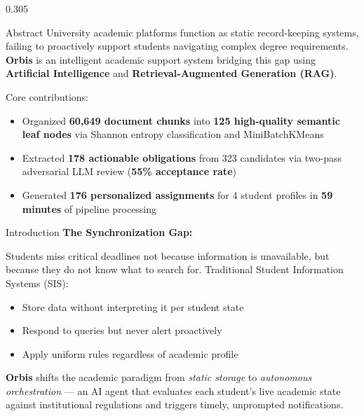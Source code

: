 \documentclass[final]{beamer}
\newcommand{\compactitem}{%
  \setlength{\itemsep}{4pt}%
  \setlength{\parskip}{0pt}%
  \setlength{\parsep}{0pt}%
  \setlength{\topsep}{2pt}%
}
\begin{document}
\begin{frame}[t]
\vskip0.9cm

\begin{columns}[T]

\begin{column}{0.305\paperwidth}

\begin{block}{Abstract}
University academic platforms function as static record-keeping
systems, failing to proactively support students navigating
complex degree requirements. \textbf{Orbis} is an intelligent
academic support system bridging this gap using
\textbf{Artificial Intelligence} and
\textbf{Retrieval-Augmented Generation (RAG)}.

\vskip0.30cm
Core contributions:
\begin{itemize}\compactitem
  \item Organized \textbf{60,649 document chunks} into
        \textbf{125 high-quality semantic leaf nodes} via
        Shannon entropy classification and MiniBatchKMeans
  \item Extracted \textbf{178 actionable obligations} from 323
        candidates via two-pass adversarial LLM review
        (\textbf{55\% acceptance rate})
  \item Generated \textbf{176 personalized assignments} for 4
        student profiles in \textbf{59 minutes} of pipeline
        processing
\end{itemize}
\end{block}

\begin{block}{Introduction}
\textbf{The Synchronization Gap:}

Students miss critical deadlines not because information is
unavailable, but because they do not know what to search for.
Traditional Student Information Systems (SIS):
\begin{itemize}\compactitem
  \item Store data without interpreting it per student state
  \item Respond to queries but never alert proactively
  \item Apply uniform rules regardless of academic profile
\end{itemize}

\vskip0.35cm
\textbf{Orbis} shifts the academic paradigm from
\textit{static storage} to \textit{autonomous orchestration}
--- an AI agent that evaluates each student's live academic
state against institutional regulations and triggers timely,
unprompted notifications.
\end{block}


\end{column}
\end{columns}
\end{frame}
\end{document}
